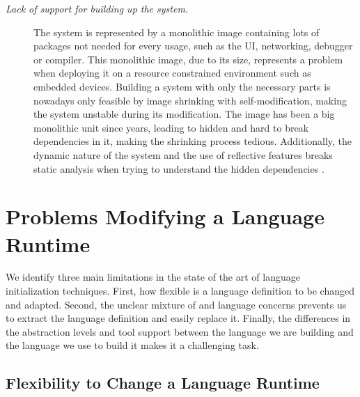 \begin{description}
\item[\emph{Lack of support for building up the system.}] The system is represented by a monolithic image containing lots of packages not needed for every usage, such as the UI, networking, debugger or compiler. This monolithic image, due to its size, represents a problem when deploying it on a resource constrained environment such as embedded devices. Building a system with only the necessary parts is nowadays only feasible by image shrinking with self-modification, making the system unstable during its modification.
The image has been a big monolithic unit since years, leading to hidden and hard to break dependencies in it, making the shrinking process tedious. Additionally, the dynamic nature of the system and the use of reflective features breaks static analysis when trying to understand the hidden dependencies \cite{Livs05a}.
\end{description}



\section{Problems Modifying a Language Runtime} \label{sec:bootstrapping_problems}

We identify three main limitations in the state of the art of language initialization techniques. First, how flexible is a language definition to be changed and adapted. Second, the unclear mixture of \VM and language concerns prevents us to extract the language definition and easily replace it. Finally, the differences in the abstraction levels and tool support between the language we are building and the language we use to build it makes it a challenging task.


\subsection{Flexibility to Change a Language Runtime}

